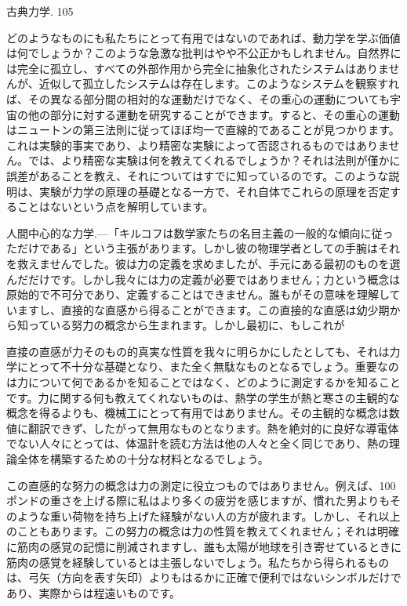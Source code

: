 \documentclass[a4paper,11pt,openany]{ltjsbook}
\begin{document}
古典力学. 105

どのようなものにも私たちにとって有用ではないのであれば、動力学を学ぶ価値は何でしょうか？このような急激な批判はやや不公正かもしれません。自然界には完全に孤立し、すべての外部作用から完全に抽象化されたシステムはありませんが、近似して孤立したシステムは存在します。このようなシステムを観察すれば、その異なる部分間の相対的な運動だけでなく、その重心の運動についても宇宙の他の部分に対する運動を研究することができます。すると、その重心の運動はニュートンの第三法則に従ってほぼ均一で直線的であることが見つかります。これは実験的事実であり、より精密な実験によって否認されるものではありません。では、より精密な実験は何を教えてくれるでしょうか？それは法則が僅かに誤差があることを教え、それについてはすでに知っているのです。このような説明は、実験が力学の原理の基礎となる一方で、それ自体でこれらの原理を否定することはないという点を解明しています。

人間中心的な力学.—「キルコフは数学家たちの名目主義の一般的な傾向に従っただけである」という主張があります。しかし彼の物理学者としての手腕はそれを救えませんでした。彼は力の定義を求めましたが、手元にある最初のものを選んだだけです。しかし我々には力の定義が必要ではありません；力という概念は原始的で不可分であり、定義することはできません。誰もがその意味を理解していますし、直接的な直感から得ることができます。この直接的な直感は幼少期から知っている努力の概念から生まれます。しかし最初に、もしこれが


直接の直感が力そのもの的真実な性質を我々に明らかにしたとしても、それは力学にとって不十分な基礎となり、また全く無駄なものとなるでしょう。重要なのは力について何であるかを知ることではなく、どのように測定するかを知ることです。力に関する何も教えてくれないものは、熱学の学生が熱と寒さの主観的な概念を得るよりも、機械工にとって有用ではありません。その主観的な概念は数値に翻訳できず、したがって無用なものとなります。熱を絶対的に良好な導電体でない人々にとっては、体温計を読む方法は他の人々と全く同じであり、熱の理論全体を構築するための十分な材料となるでしょう。

この直感的な努力の概念は力の測定に役立つものではありません。例えば、100ポンドの重さを上げる際に私はより多くの疲労を感じますが、慣れた男よりもそのような重い荷物を持ち上げた経験がない人の方が疲れます。しかし、それ以上のこともあります。この努力の概念は力の性質を教えてくれません；それは明確に筋肉の感覚の記憶に削減されますし、誰も太陽が地球を引き寄せているときに筋肉の感覚を経験しているとは主張しないでしょう。私たちから得られるものは、弓矢（方向を表す矢印）よりもはるかに正確で便利ではないシンボルだけであり、実際からは程遠いものです。
\end{document}
